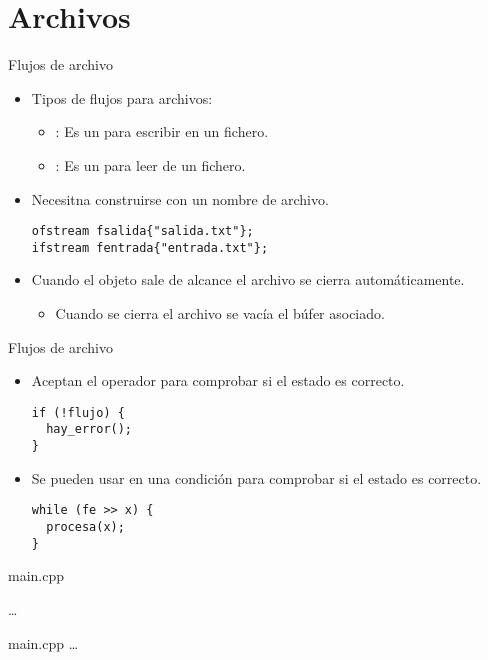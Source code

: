 \section{Archivos}

\begin{frame}[t,fragile]{Flujos de archivo}
\begin{itemize}
  \item Tipos de flujos para archivos:
    \begin{itemize}
      \item {}: Es un  para escribir en un fichero.
      \item {}: Es un  para leer de un fichero.
    \end{itemize}
  \vfill
  \item Necesitna construirse con un nombre de archivo.
\begin{lstlisting}
ofstream fsalida{"salida.txt"};
ifstream fentrada{"entrada.txt"};
\end{lstlisting}
  \vfill
  \item Cuando el objeto sale de alcance el archivo se cierra automáticamente.
    \begin{itemize}
      \item Cuando se cierra el archivo se vacía el búfer asociado.
    \end{itemize}
\end{itemize}
\end{frame}

\begin{frame}[t,fragile]{Flujos de archivo}
\begin{itemize}
  \item Aceptan el operador \cppkey{!} para comprobar si el estado es correcto.
\begin{lstlisting}
if (!flujo) { 
  hay_error(); 
}
\end{lstlisting}
  \item Se pueden usar en una condición para comprobar si el estado es correcto.
\begin{lstlisting}
while (fe >> x) { 
  procesa(x); 
}
\end{lstlisting}
\end{itemize}
\end{frame}

 {

\begin{frame}
\begin{block}{main.cpp}

\ldots
\end{block}
\end{frame}

\begin{frame}
\begin{block}{main.cpp}
\ldots

\end{block}
\end{frame}

}

